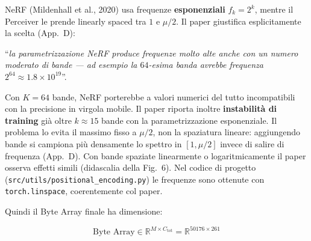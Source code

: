 \documentclass[
  11pt,
]{article}
\begin{document}
\begin{notabox}[title={\textbf{Perché non le frequenze di NeRF ($f_k = 2^k$)?}}]
NeRF (Mildenhall et al., 2020) usa frequenze \textbf{esponenziali} $f_k = 2^k$, mentre il Perceiver le prende linearly spaced tra $1$ e $\mu/2$. Il paper giustifica esplicitamente la scelta (App.\ D):

``\emph{la parametrizzazione NeRF produce frequenze molto alte anche con un numero moderato di bande --- ad esempio la $64$-esima banda avrebbe frequenza $2^{64} \approx 1.8 \times 10^{19}$}''.

Con $K = 64$ bande, NeRF porterebbe a valori numerici del tutto incompatibili con la precisione in virgola mobile. Il paper riporta inoltre \textbf{instabilità di training} già oltre $k \approx 15$ bande con la parametrizzazione esponenziale. Il problema lo evita il massimo fisso a $\mu/2$, non la spaziatura lineare: aggiungendo bande si campiona più densamente lo spettro in $[1, \mu/2]$ invece di salire di frequenza (App.~D). Con bande spaziate linearmente o logaritmicamente il paper osserva effetti simili (didascalia della Fig.~6). Nel codice di progetto (\texttt{src/utils/positional\_encoding.py}) le frequenze sono ottenute con \texttt{torch.linspace}, coerentemente col paper.
\end{notabox}

Quindi il Byte Array finale ha dimensione:

\[
\text{Byte Array} \in \mathbb{R}^{M \times C_{\text{tot}}} = \mathbb{R}^{50176 \times 261}
\]
\end{document}
